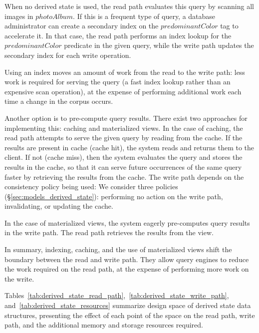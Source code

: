 When no derived state is used, the read path evaluates this query by scanning all images in $photoAlbum$.
If this is a frequent type of query,
a database administrator can create a secondary index on the $predominantColor$ tag to accelerate it.
In that case, the read path performs an index lookup for the $predominantColor$ predicate in the given query,
while the write path updates the secondary index for each write operation.

Using an index moves an amount of work from the read to the write path:
less work is required for serving the query (a fast index lookup rather than an expensive scan operation),
at the expense of performing additional work each time a change in the corpus occurs.

Another option is to pre-compute query results.
There exist two approaches for implementing this: caching and materialized views.
In the case of caching, the read path attempts to serve the given query by reading from the cache.
If the results are present in cache (cache hit), the system reads and returns them to the client.
If not (cache miss), then the system evaluates the query and stores the results in the cache,
so that it can serve future occurrences of the same query faster by retrieving the results from the cache.
The write path depends on the consistency policy being used:
We consider three policies (\S\ref{sec:models_derived_state}):
performing no action on the write path, invalidating, or updating the cache.

In the case of materialized views, the system eagerly pre-computes query results in the write path.
The read path retrieves the results from the view.

In summary, indexing, caching, and the use of materialized views shift the boundary between the read and write path.
They allow query engines to reduce the work required on the read path, at the expense of performing more work on the write.

Tables~\ref{tab:derived_state_read_path},~\ref{tab:derived_state_write_path}, and~\ref{tab:derived_state_resources} summarize
design space of derived state data structures,
presenting the effect of each point of the space on the read path, write path, and the additional
memory and storage resources required.

